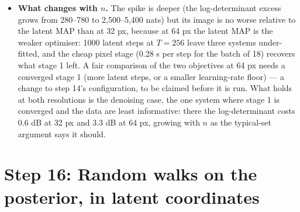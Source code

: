 \documentclass[11pt]{article}
\begin{document}
\begin{itemize}
  \item \textbf{What changes with $n$.} The spike is deeper (the
        log-determinant excess grows from 280--780 to 2,500--5,400 nats)
        but its image is no worse relative to the latent MAP than at 32 px,
        because at 64 px the latent MAP is the weaker optimiser: 1000
        latent steps at $T = 256$ leave three systems under-fitted, and the
        cheap pixel stage (0.28 s per step for the batch of 18) recovers
        what stage 1 left. A fair comparison of the two objectives at 64 px
        needs a converged stage 1 (more latent steps, or a smaller
        learning-rate floor) --- a change to step 14's configuration, to
        be claimed before it is run. What holds at both resolutions is the
        denoising case, the one system where stage 1 is converged and the
        data are least informative: there the log-determinant costs 0.6 dB
        at 32 px and 3.3 dB at 64 px, growing with $n$ as the typical-set
        argument says it should.
\end{itemize}

\section{Step 16: Random walks on the posterior, in latent coordinates}
\label{sec:step16}
\end{document}
